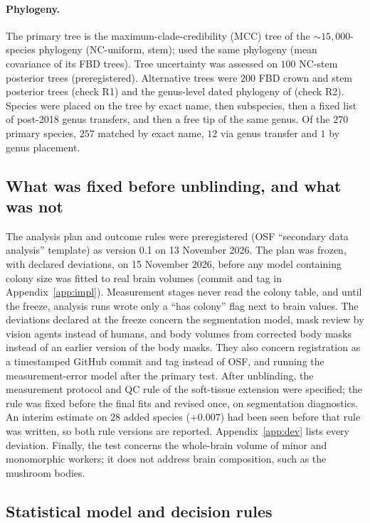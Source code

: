 \documentclass[11pt]{article}
\begin{document}
\paragraph{Phylogeny.} The primary tree is the maximum-clade-credibility (MCC) tree of the \citet{economo2018}
${\sim}15{,}000$-species phylogeny (NC-uniform, stem); \citet{matte2025} used the same phylogeny (mean covariance of
its FBD trees). Tree uncertainty was assessed on $100$ NC-stem posterior trees (preregistered). Alternative trees were
$200$ FBD crown and stem posterior trees (check R1) and the genus-level dated phylogeny of \citet{borowiec2025}
(check R2). Species were placed on the tree by exact name, then subspecies, then a fixed list of post-2018 genus
transfers, and then a free tip of the same genus. Of the $270$ primary species, $257$ matched by exact name, $12$ via
genus transfer and $1$ by genus placement.

\subsection{What was fixed before unblinding, and what was not}\label{sec:prereg}

The analysis plan and outcome rules were preregistered (OSF ``secondary data analysis'' template) as version 0.1
on 13 November 2026. The plan was frozen, with declared deviations, on 15 November 2026,
before any model containing colony size was fitted to real brain volumes (commit and tag in Appendix~\ref{app:impl}).
Measurement stages never read the colony table, and until the freeze, analysis runs wrote only a ``has colony'' flag
next to brain values. The deviations declared at the freeze concern the segmentation model, mask review by vision
agents instead of humans, and body volumes from corrected body masks instead of an earlier version of the body masks.
They also concern registration as a
timestamped GitHub commit and tag instead of OSF, and running the measurement-error model after the primary test.
After unblinding, the measurement protocol and QC rule of the soft-tissue extension were specified; the rule was fixed
before the final fits and revised once, on segmentation diagnostics. An interim estimate on $28$ added species
($+0.007$) had been seen before that rule was written, so both rule versions are reported. Appendix~\ref{app:dev}
lists every deviation. Finally, the test concerns the whole-brain volume of minor and monomorphic workers; it does not
address brain composition, such as the mushroom bodies.

\subsection{Statistical model and decision rules}\label{sec:model}
\end{document}
